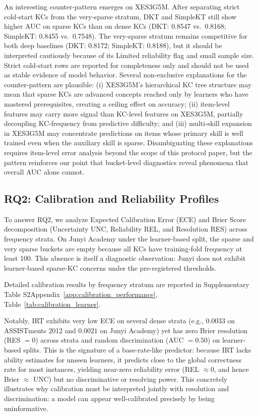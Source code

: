 An interesting counter-pattern emerges on XES3G5M. After separating strict cold-start KCs from the very-sparse stratum, DKT and SimpleKT still show higher AUC on sparse KCs than on dense KCs (DKT: 0.8547 vs.\ 0.8168; SimpleKT: 0.8455 vs.\ 0.7548). The very-sparse stratum remains competitive for both deep baselines (DKT: 0.8172; SimpleKT: 0.8188), but it should be interpreted cautiously because of its Limited reliability flag and small sample size. Strict cold-start rows are reported for completeness only and should not be used as stable evidence of model behavior. Several non-exclusive explanations for the counter-pattern are plausible: (i) XES3G5M's hierarchical KC tree structure may mean that sparse KCs are advanced concepts reached only by learners who have mastered prerequisites, creating a ceiling effect on accuracy; (ii) item-level features may carry more signal than KC-level features on XES3G5M, partially decoupling KC-frequency from predictive difficulty; and (iii) multi-skill expansion in XES3G5M may concentrate predictions on items whose primary skill is well trained even when the auxiliary skill is sparse. Disambiguating these explanations requires item-level error analysis beyond the scope of this protocol paper, but the pattern reinforces our point that bucket-level diagnostics reveal phenomena that overall AUC alone cannot.

\subsection{RQ2: Calibration and Reliability Profiles}
To answer RQ2, we analyze Expected Calibration Error (ECE) and Brier Score decomposition (Uncertainty UNC, Reliability REL, and Resolution RES) across frequency strata. On Junyi Academy under the learner-based split, the sparse and very sparse buckets are empty because all KCs have training-fold frequency at least 100. This absence is itself a diagnostic observation: Junyi does not exhibit learner-based sparse-KC concerns under the pre-registered thresholds.

Detailed calibration results by frequency stratum are reported in \ifdefined\iscompact Supplementary Table S2\else Appendix~\ref{app:calibration_performance}, Table~\ref{tab:calibration_learner}\fi.

Notably, IRT exhibits very low ECE on several dense strata (e.g., $0.0033$ on ASSISTments 2012 and $0.0021$ on Junyi Academy) yet has zero Brier resolution (RES $= 0$) across strata and random discrimination (AUC $= 0.50$) on learner-based splits. This is the signature of a base-rate-like predictor: because IRT lacks ability estimates for unseen learners, it predicts close to the global correctness rate for most instances, yielding near-zero reliability error (REL $\approx 0$, and hence Brier $\approx$ UNC) but no discriminative or resolving power. This concretely illustrates why calibration must be interpreted jointly with resolution and discrimination: a model can appear well-calibrated precisely by being uninformative.

